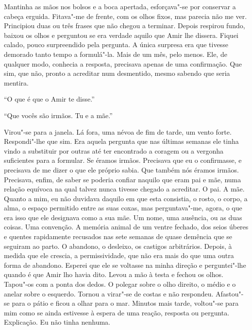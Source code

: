 Mantinha as mãos nos bolsos e a boca apertada, esforçava"-se por
conservar a cabeça erguida. Fitava"-me de frente, com os olhos fixos,
mas parecia não me ver. Principiou duas ou três frases que não chegou a
terminar. Depois respirou fundo, baixou os olhos e perguntou se era
verdade aquilo que Amir lhe dissera. Fiquei calado, pouco surpreendido
pela pergunta. A única surpresa era que tivesse demorado tanto tempo a
formulá"-la. Mais de um mês, pelo menos. Ele, de qualquer modo, conhecia
a resposta, precisava apenas de uma confirmação. Que sim, que não,
pronto a acreditar num desmentido, mesmo sabendo que seria mentira.

``O que é que o Amir te disse.''

``Que vocês são irmãos. Tu e a mãe.''

Virou"-se para a janela. Lá fora, uma névoa de fim de tarde, um vento
forte. Respondi"-lhe que sim. Era aquela pergunta que nas últimas
semanas ele tinha vindo a substituir por outras até ter encontrado a
coragem ou a vergonha suficientes para a formular. Se éramos irmãos.
Precisava que eu o confirmasse, e precisava de me dizer o que ele
próprio sabia. Que também nós éramos irmãos. Precisava, enfim, de saber
se poderia confiar naquilo que eram pai e mãe, numa relação equívoca na
qual talvez nunca tivesse chegado a acreditar. O pai. A mãe. Quanto a
mim, eu não duvidava daquilo em que esta consistia, o rosto, o corpo, a
alma, o espaço permitido entre as suas coxas, mas perguntava"-me, agora,
o que era isso que ele designava como a sua mãe. Um nome, uma ausência,
ou as duas coisas. Uma convenção. A memória animal de um ventre fechado,
dos seios úberes e quentes rapidamente recusados nas sete semanas de
quase demência que se seguiram ao parto. O abandono, o desleixo, os
castigos arbitrários. Depois, à medida que ele crescia, a
permissividade, que não era mais do que uma outra forma de abandono.
Esperei que ele se voltasse na minha direção e perguntei"-lhe quando é
que Amir lho havia dito. Levou a mão à testa e fechou os olhos.
Tapou"-os com a ponta dos dedos. O polegar sobre o olho direito, o médio
e o anelar sobre o esquerdo. Tornou a virar"-se de costas e não
respondeu. Afastou"-se para o pátio e ficou a olhar para o mar. Minutos
mais tarde, voltou"-se para mim como se ainda estivesse à espera de uma
reação, resposta ou pergunta. Explicação. Eu não tinha nenhuma.


